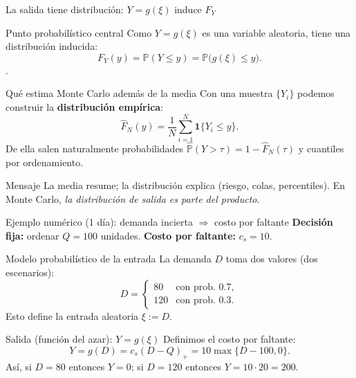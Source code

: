\documentclass[aspectratio=1610, 9pt]{beamer}
\begin{document}
\begin{frame}{La salida tiene distribución: $Y=g(\xi)$ induce $F_Y$}
\begin{block}{Punto probabilístico central}
Como $Y=g(\xi)$ es una variable aleatoria, tiene una distribución inducida:
\[
F_Y(y)=\mathbb P(Y\le y)=\mathbb P\big(g(\xi)\le y\big).
\]
.
\end{block}

\begin{block}{Qué estima Monte Carlo además de la media}
Con una muestra $\{Y_i\}$ podemos construir la \textbf{distribución empírica}:
\[
\widehat F_N(y)=\frac{1}{N}\sum_{i=1}^N \mathbf 1\{Y_i\le y\}.
\]
De ella salen naturalmente probabilidades $\widehat{\mathbb P}(Y>\tau)=1-\widehat F_N(\tau)$ y cuantiles por ordenamiento.
\end{block}

\begin{alertblock}{Mensaje}
La media resume; la distribución explica (riesgo, colas, percentiles). En Monte Carlo, \emph{la distribución de salida es parte del producto}.
\end{alertblock}
\end{frame}



\begin{frame}{Ejemplo numérico (1 día): demanda incierta \texorpdfstring{$\Rightarrow$}{->} costo por faltante}
\textbf{Decisión fija:} ordenar $Q=100$ unidades. \qquad \textbf{Costo por faltante:} $c_s=10$.

\medskip
\begin{block}{Modelo probabilístico de la entrada}
La demanda $D$ toma dos valores (dos escenarios):
\[
D=
\begin{cases}
80 & \text{con prob. } 0.7,\\
120 & \text{con prob. } 0.3.
\end{cases}
\]
Esto define la entrada aleatoria $\xi:=D$.
\end{block}

\begin{block}{Salida (función del azar): \texorpdfstring{$Y=g(\xi)$}{Y=g(xi)}}
Definimos el costo por faltante:
\[
Y=g(D)=c_s(D-Q)_+=10\max\{D-100,0\}.
\]
Así, si $D=80$ entonces $Y=0$; si $D=120$ entonces $Y=10\cdot 20=200$.
\end{block}
\end{frame}
\end{document}

